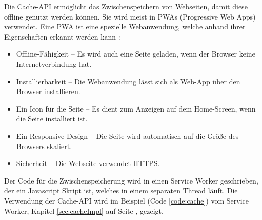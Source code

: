 \label{sec:cache}

Die Cache-API ermöglicht das Zwischenspeichern von Webseiten, damit diese offline genutzt werden können.
Sie wird meist in PWAs (Progressive Web Apps) verwendet. 
Eine PWA ist eine spezielle Webanwendung, welche anhand ihrer Eigenschaften erkannt werden kann \cite{datacodedesignPWA}:
\begin{itemize}
    \item Offline-Fähigkeit -- Es wird auch eine Seite geladen, wenn der Browser keine Internetverbindung hat.
    \item Installierbarkeit -- Die Webanwendung lässt sich als Web-App über den Browser installieren.
    \item Ein Icon für die Seite -- Es dient zum Anzeigen auf dem Home-Screen, wenn die Seite installiert ist.
    \item Ein Responsive Design -- Die Seite wird automatisch auf die Größe des Browsers skaliert.
    \item Sicherheit -- Die Webseite verwendet HTTPS.
\end{itemize}

Der Code für die Zwischenspeicherung wird in einen Service Worker geschrieben, der ein Javascript Skript ist, welches in einem separaten Thread läuft. 
Die Verwendung der Cache-API wird im Beispiel (Code \ref{code:cache}) vom Service Worker, Kapitel \ref{sec:cacheImpl} auf Seite \pageref{code:cache}, gezeigt.